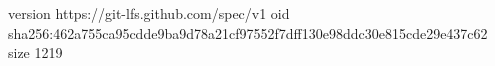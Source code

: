 version https://git-lfs.github.com/spec/v1
oid sha256:462a755ca95cdde9ba9d78a21cf97552f7dff130e98ddc30e815cde29e437c62
size 1219
